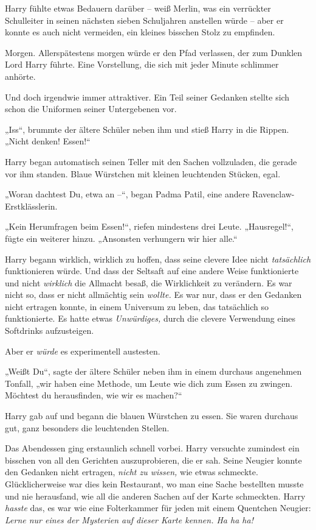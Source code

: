 {Harry fühlte etwas Bedauern darüber -- weiß Merlin, was ein verrückter Schulleiter in seinen nächsten sieben Schuljahren anstellen würde -- aber er konnte es auch nicht vermeiden, ein kleines bisschen Stolz zu empfinden.

Morgen. Allerspätestens morgen würde er den Pfad verlassen, der zum Dunklen Lord Harry führte. Eine Vorstellung, die sich mit jeder Minute schlimmer anhörte.

Und doch irgendwie immer attraktiver. Ein Teil seiner Gedanken stellte sich schon die Uniformen seiner Untergebenen vor.

„Iss“, brummte der ältere Schüler neben ihm und stieß Harry in die Rippen. „Nicht denken! Essen!“

Harry began automatisch seinen Teller mit den Sachen vollzuladen, die gerade vor ihm standen. Blaue Würstchen mit kleinen leuchtenden Stücken, egal.

„Woran dachtest Du, etwa an --“, began Padma Patil, eine andere Ravenclaw-Erstklässlerin.

„Kein Herumfragen beim Essen!“, riefen mindestens drei Leute. „Hausregel!“, fügte ein weiterer hinzu. „Ansonsten verhungern wir hier alle.“

Harry begann wirklich, wirklich zu hoffen, dass seine clevere Idee nicht \emph{tatsächlich} funktionieren würde. Und dass der Seltsaft auf eine andere Weise funktionierte und nicht \emph{wirklich} die Allmacht besaß, die Wirklichkeit zu verändern. Es war nicht so, dass er nicht allmächtig sein \emph{wollte.} Es war nur, dass er den Gedanken nicht ertragen konnte, in einem Universum zu leben, das tatsächlich so funktionierte. Es hatte etwas \emph{Unwürdiges,} durch die clevere Verwendung eines Softdrinks aufzusteigen.

Aber er \emph{würde} es experimentell austesten.

„Weißt Du“, sagte der ältere Schüler neben ihm in einem durchaus angenehmen Tonfall, „wir haben eine Methode, um Leute wie dich zum Essen zu zwingen. Möchtest du herausfinden, wie wir es machen?“

Harry gab auf und begann die blauen Würstchen zu essen. Sie waren durchaus gut, ganz besonders die leuchtenden Stellen.

Das Abendessen ging erstaunlich schnell vorbei. Harry versuchte zumindest ein bisschen von all den Gerichten auszuprobieren, die er sah. Seine Neugier konnte den Gedanken nicht ertragen, \emph{nicht zu wissen,} wie etwas schmeckte. Glücklicherweise war dies kein Restaurant, wo man eine Sache bestellten musste und nie herausfand, wie all die anderen Sachen auf der Karte schmeckten. Harry \emph{hasste} das, es war wie eine Folterkammer für jeden mit einem Quentchen Neugier: \emph{Lerne nur eines der Mysterien auf dieser Karte kennen. Ha ha ha!}

}
